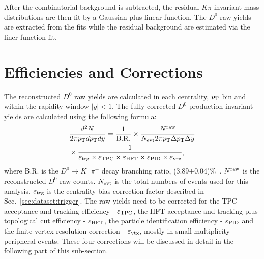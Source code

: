 \documentclass[%
 reprint,	
 amsmath,amssymb,
 aps,
 prc,
]{revtex4-1}
\begin{document}
After the combinatorial background is subtracted, the residual $K\pi$ invariant mass distributions are then fit by a Gaussian plus linear function. %
The $D^0$ raw yields are extracted from the fits while the residual background are estimated via the liner function fit.

\section{\label{sec:correction}Efficiencies and Corrections}
The reconstructed $D^0$ raw yields are calculated in each centrality, $p_{\rm T}$ bin and within the rapidity window $|y|<1$. The fully corrected $D^0$ production invariant yields are calculated using the following formula:
\begin{equation}
  \begin{aligned}
& \frac{d^2N}{2\pi p_{\rm T}dp_{\rm T}dy} = \frac{1}{\rm B.R.} \times \frac{N^{\rm raw}}{N_{\rm evt} 2\pi p_{\rm T}\Delta p_{\rm T}\Delta y} \\
& \times \frac{1}{\varepsilon_{\rm trg}\times\varepsilon_{\rm TPC}\times\varepsilon_{\rm HFT}\times\varepsilon_{\rm PID}\times\varepsilon_{\rm vtx}},
  \end{aligned}
\label{equ:invariantyield}
\end{equation}
where B.R. is the $D^0\rightarrow K^-\pi^+$ decay branching ratio, (3.89$\pm$0.04)\%~\cite{pdg}. $N^{\rm raw}$ is the reconstructed $D^0$ raw counts. $N_{\rm evt}$ is the total numbers of events used for this analysis. $\varepsilon_{\rm trg}$ is the centrality bias correction factor described in Sec.~\ref{sec:dataset:trigger}. The raw yields need to be corrected for the TPC acceptance and tracking efficiency - $\varepsilon_{\rm TPC}$, the HFT acceptance and tracking plus topological cut efficiency - $\varepsilon_{\rm HFT}$, the particle identification efficiency - $\varepsilon_{\rm PID}$ and the finite vertex resolution correction - $\varepsilon_{\rm vtx}$, mostly in small multiplicity peripheral events. These four corrections will be discussed in detail in the following part of this sub-section.
\end{document}
